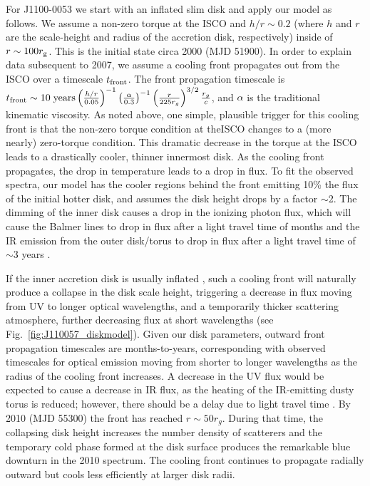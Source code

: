\documentclass{nature}
\begin{document}
For J1100-0053 we start with an inflated slim disk and apply our model as follows. We assume a non-zero torque at the ISCO and $h/r\sim0.2$ (where $h$ and $r$ are the scale-height and radius of the accretion disk, respectively) inside of $r\sim100 r_{\rm g}$. This is the initial state circa 2000 (MJD 51900). In order to explain data subsequent to 2007, we assume a cooling front propagates out from the ISCO over a timescale $t_{\rm front}$. The front propagation timescale is $ t_{\rm front} \sim 10 \; {\rm years} \left(\frac{h/r}{0.05}\right)^{-1} \left(\frac{\alpha}{0.3}\right)^{-1} \left(\frac{r}{225r_{g}}\right)^{3/2} \frac{r_{g}}{c}$, and $\alpha$ is the traditional kinematic viscosity. As noted above, one simple, plausible trigger for this cooling front is that the non-zero torque condition at theISCO changes to a (more nearly) zero-torque condition. This dramatic decrease in the torque at the ISCO leads to a drastically cooler, thinner innermost disk. As the cooling front propagates, the drop in temperature leads to a drop in flux. To fit the observed spectra, our model has the cooler regions behind the front emitting 10\% the flux of the initial hotter disk, and assumes the disk height drops by a factor $\sim$2. The dimming of the inner disk causes a drop in the ionizing photon flux, which will cause the Balmer lines to drop in flux after a light travel time of months and the IR emission from the outer disk/torus to drop in flux after a light travel time of $\sim$3 years \citep{Sirko_Goodman2003, Koshida2014, Jun2015}.

If the inner accretion disk is usually inflated \cite[see e.g., ][]{Sirko_Goodman2003, Thompson2005, Hopkins_Quataert2011}, such a cooling front will naturally produce a collapse in the disk scale height, triggering a decrease in flux moving from UV to longer optical wavelengths, and a temporarily thicker scattering atmosphere, further decreasing flux at short wavelengths (see Fig.~\ref{fig:J110057_diskmodel}).  Given our disk parameters, outward front propagation timescales are months-to-years, corresponding with observed timescales for optical emission moving from shorter to longer wavelengths as the radius of the cooling front increases. A decrease in the UV flux would be expected to cause a decrease in IR flux, as the heating of the IR-emitting dusty torus is reduced; however, there should be a delay due to light travel time \cite[e.g., ][]{Jun2015}. By 2010 (MJD 55300) the front has reached $r\sim50 r_{g}$. During that time, the collapsing disk height increases the number density of scatterers and the temporary cold phase formed at the disk surface produces the remarkable blue downturn in the 2010 spectrum. The cooling front continues to propagate radially outward but cools less efficiently at larger disk radii. 
\end{document}
